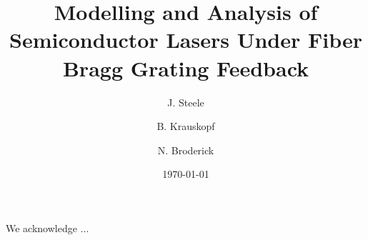 \documentclass[
  reprint,            %
  amsmath,amssymb,    %
  aps,pre             %
]{revtex4-2}
\begin{document}

\title{Modelling and Analysis of Semiconductor Lasers Under Fiber Bragg Grating Feedback}

\author{J. Steele}
\author{B. Krauskopf}
\author{N. Broderick}


\date{\today}





\maketitle






\begin{acknowledgments}
We acknowledge ...
\end{acknowledgments}

\appendix




\end{document}
